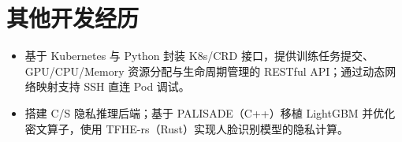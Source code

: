 \documentclass{resume}
\begin{document}
\section{其他开发经历}
\begin{itemize}
  \item 基于 Kubernetes 与 Python 封装 K8s/CRD 接口，提供训练任务提交、GPU/CPU/Memory 资源分配与生命周期管理的 RESTful API；通过动态网络映射支持 SSH 直连 Pod 调试。
\end{itemize}
\begin{itemize}
  \item 搭建 C/S 隐私推理后端；基于 PALISADE（C++）移植 LightGBM 并优化密文算子，使用 TFHE-rs（Rust）实现人脸识别模型的隐私计算。
\end{itemize}
\end{document}
